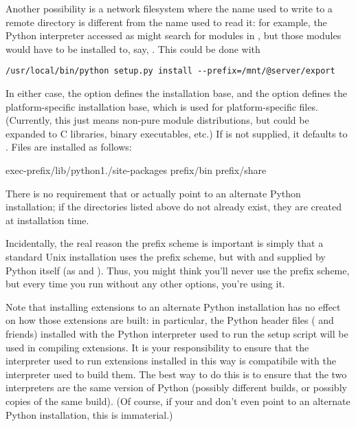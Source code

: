\documentclass{howto}
\begin{document}
Another possibility is a network filesystem where the name used to write
to a remote directory is different from the name used to read it: for
example, the Python interpreter accessed as 
might search for modules in ,
but those modules would have to be installed to, say,
.  This
could be done with
\begin{verbatim}
/usr/local/bin/python setup.py install --prefix=/mnt/@server/export
\end{verbatim}

In either case, the  option defines the installation
base, and the  option defines the platform-specific
installation base, which is used for platform-specific files.
(Currently, this just means non-pure module distributions, but could be
expanded to C libraries, binary executables, etc.)  If
 is not supplied, it defaults to .
Files are installed as follows:

              {exec-prefix}{/lib/python1./site-packages}
              {prefix}{/bin}
              {prefix}{/share}

There is no requirement that  or 
actually point to an alternate Python installation; if the directories
listed above do not already exist, they are created at installation
time.

Incidentally, the real reason the prefix scheme is important is simply
that a standard Unix installation uses the prefix scheme, but with
 and  supplied by Python itself (as
 and ).  Thus, you might think
you'll never use the prefix scheme, but every time you run  without any other options, you're using it.

Note that installing extensions to an alternate Python installation has
no effect on how those extensions are built: in particular, the Python
header files ( and friends) installed with the Python
interpreter used to run the setup script will be used in compiling
extensions.  It is your responsibility to ensure that the interpreter
used to run extensions installed in this way is compatibile with the
interpreter used to build them.  The best way to do this is to ensure
that the two interpreters are the same version of Python (possibly
different builds, or possibly copies of the same build).  (Of course, if
your  and  don't even point to an
alternate Python installation, this is immaterial.)
\end{document}
